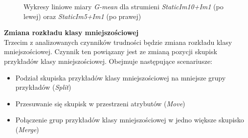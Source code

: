 \begin{figure}[h]
    \centering
    \qquad
    \caption{Wykresy liniowe miary \textit{G-mean} dla strumieni \textit{StaticIm10+Im1} (po lewej) oraz \textit{StaticIm5+Im1} (po prawej)}\label{Figure:StaticIm10_Im1}
\end{figure}

\vspace{0.7cm}

\noindent \textbf{Zmiana rozkładu klasy mniejszościowej}\\

\noindent Trzecim z analizowanych czynników trudności będzie zmiana rozkładu klasy mniejszościowej. Czynnik ten powiązany jest ze zmianą pozycji skupisk przykładów klasy mniejszościowej. Obejmuje następujące scenariusze:

\begin{itemize}
    \item Podział skupiska przykładów klasy mniejszościowej na mniejsze grupy przykładów (\textit{Split})
    \item Przesuwanie się skupisk w przestrzeni atrybutów (\textit{Move})
    \item Połączenie grup przykładów klasy mniejszościowej w jedno większe skupisko (\textit{Merge})
\end{itemize}

